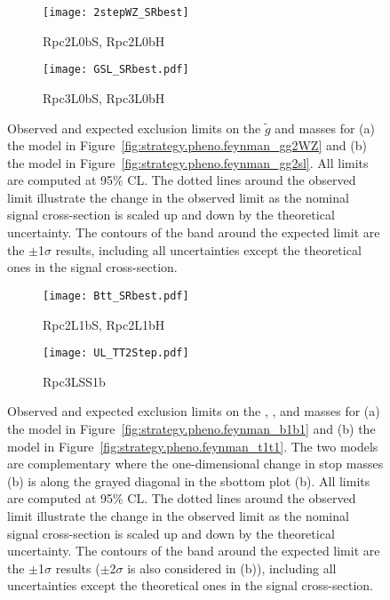 \begin{figure}[htb!]
\centering
\begin{subfigure}[t]{0.49\textwidth}\texttt{[image: 2stepWZ\_SRbest]}\caption{Rpc2L0bS, Rpc2L0bH}\label{fig:limits_feynman_gg2WZ}\end{subfigure}
\begin{subfigure}[t]{0.49\textwidth}\texttt{[image: GSL\_SRbest.pdf]}\caption{Rpc3L0bS, Rpc3L0bH}\label{fig:limits_feynman_gg2sl}\end{subfigure}
\caption{Observed and expected exclusion limits on the $\tilde{g}$ and \ninoone masses 
for (a) the model in Figure~\ref{fig:strategy.pheno.feynman_gg2WZ} 
and (b) the model in Figure~\ref{fig:strategy.pheno.feynman_gg2sl}. 
All limits are computed at 95\% CL. The dotted lines around the observed
limit illustrate the change in the observed limit as the nominal signal cross-section is scaled up and down
by the theoretical uncertainty. The contours of the band around the expected 
limit are the $\pm$1$\sigma$ results,
including all uncertainties except the theoretical ones in the signal cross-section.}
\label{fig:Results_Limits_RPC2} 
\end{figure} 

\begin{figure}[htb!]
\centering
\begin{subfigure}[t]{0.49\textwidth}\texttt{[image: Btt\_SRbest.pdf]}\caption{Rpc2L1bS, Rpc2L1bH}\label{fig:limits_feynman_b1b1}\end{subfigure}
\begin{subfigure}[t]{0.49\textwidth}\texttt{[image: UL\_TT2Step.pdf]}\caption{Rpc3LSS1b}\label{fig:limits_feynman_t1t1}\end{subfigure}
\caption{
Observed and expected exclusion limits on the  \sbottomone, \stopone, and \ninoone masses 
for (a) the model in Figure~\ref{fig:strategy.pheno.feynman_b1b1}
and (b) the model in Figure~\ref{fig:strategy.pheno.feynman_t1t1}. 
The two models are complementary where the one-dimensional change in stop masses (b) is along the grayed diagonal in the sbottom plot (b).
All limits are computed at 95\% CL. The dotted lines around the observed
limit illustrate the change in the observed limit as the nominal signal cross-section is scaled up and down
by the theoretical uncertainty. The contours of the band around the expected 
limit are the $\pm$1$\sigma$ results  ($\pm$2$\sigma$ is also considered in (b)),
including all uncertainties except the theoretical ones in the signal cross-section.
}
\label{fig:Results_Limits_NUHM2} 
\end{figure} 

